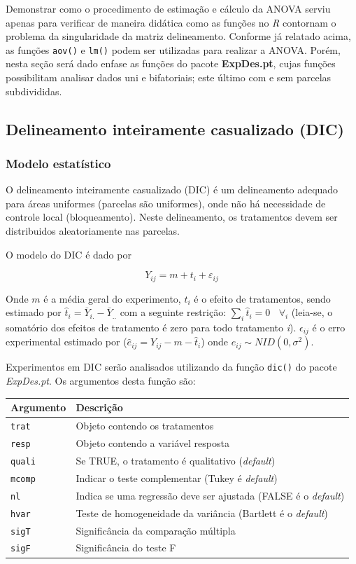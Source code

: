 \documentclass[
]{book}
\begin{document}
Demonstrar como o procedimento de estimação e cálculo da ANOVA serviu apenas para verificar de maneira didática como as funções no \emph{R} contornam o problema da singularidade da matriz delineamento. Conforme já relatado acima, as funções \texttt{aov()} e \texttt{lm()} podem ser utilizadas para realizar a ANOVA. Porém, nesta seção será dado enfase as funções do pacote \textbf{ExpDes.pt},  cujas funções possibilitam analisar dados uni e bifatoriais; este último com e sem parcelas subdivididas.

\hypertarget{delineamento-inteiramente-casualizado-dic}{%
\subsection{Delineamento inteiramente casualizado (DIC)}\label{delineamento-inteiramente-casualizado-dic}}

\hypertarget{modelo-estatuxedstico}{%
\subsubsection{Modelo estatístico}\label{modelo-estatuxedstico}}

O delineamento inteiramente casualizado (DIC) é um delineamento adequado para áreas uniformes (parcelas são uniformes), onde não há necessidade de controle local (bloqueamento). Neste delineamento, os tratamentos devem ser distribuidos aleatoriamente nas parcelas.

O modelo do DIC é dado por 

\[
{Y_{ij}} = m + {t_i} + {\varepsilon _{ij}}
\]

Onde \(m\) é a média geral do experimento, \(t_i\) é o efeito de tratamentos, sendo estimado por \(\hat t_i = \bar Y_{i.} - \bar Y_{..}\) com a seguinte restrição: \(\sum_i \hat t_i = 0 ~~~~\forall_i\) (leia-se, o somatório dos efeitos de tratamento é zero para todo tratamento \emph{i}). \(\epsilon_{ij}\) é o erro experimental estimado por (\(\hat e_{ij} = Y_{ij} - m - \hat t_i\)) onde \({e_{ij}}\sim NID(0,{\sigma ^2})\).

Experimentos em DIC serão analisados utilizando da função \texttt{dic()}  do pacote \emph{ExpDes.pt}. Os argumentos desta função são:

\begin{longtable}[]{@{}ll@{}}
\toprule
Argumento & Descrição\tabularnewline
\midrule
\endhead
\texttt{trat} & Objeto contendo os tratamentos\tabularnewline
\texttt{resp} & Objeto contendo a variável resposta\tabularnewline
\texttt{quali} & Se TRUE, o tratamento é qualitativo (\emph{default})\tabularnewline
\texttt{mcomp} & Indicar o teste complementar (Tukey é \emph{default})\tabularnewline
\texttt{nl} & Indica se uma regressão deve ser ajustada (FALSE é o \emph{default})\tabularnewline
\texttt{hvar} & Teste de homogeneidade da variância (Bartlett é o \emph{default})\tabularnewline
\texttt{sigT} & Significância da comparação múltipla\tabularnewline
\texttt{sigF} & Significância do teste F\tabularnewline
\bottomrule
\end{longtable}
\end{document}
